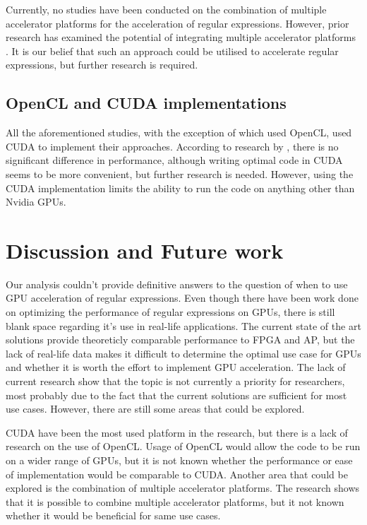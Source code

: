 \documentclass[10pt,onecolumn,twoside,english,a4paper]{article}
\begin{document}
Currently, no studies have been conducted on the combination of multiple accelerator platforms for the acceleration of regular expressions. However, prior research has examined the potential of integrating multiple accelerator platforms \cite{kobayashi2019gpu}. It is our belief that such an approach could be utilised to accelerate regular expressions, but further research is required.

\subsection{OpenCL and CUDA implementations} \label{OpenCL and CUDA implementations:Results}
All the aforementioned studies, with the exception of \cite{rosciszewski2014regular} which used OpenCL, used CUDA to implement their approaches. According to research by \cite{Fang:Comparison-cuda-opencl}, there is no significant difference in performance, although writing optimal code in CUDA seems to be more convenient, but further research is needed.
However, using the CUDA implementation limits the ability to run the code on anything other than Nvidia GPUs.

\section{Discussion and Future work} \label{Discussion and Future work}
Our analysis couldn't provide definitive answers to the question of when to use GPU acceleration of regular expressions. Even though there have been work done on optimizing the performance of regular expressions on GPUs, there is still blank space regarding it's use in real-life applications. The current state of the art solutions provide theoreticly comparable performance to FPGA and AP, but the lack of real-life data makes it difficult to determine the optimal use case for GPUs and whether it is worth the effort to implement GPU acceleration. The lack of current research show that the topic is not currently a priority for researchers, most probably due to the fact that the current solutions are sufficient for most use cases. However, there are still some areas that could be explored.

CUDA have been the most used platform in the research, but there is a lack of research on the use of OpenCL. Usage of OpenCL would allow the code to be run on a wider range of GPUs, but it is not known whether the performance or ease of implementation would be comparable to CUDA.
Another area that could be explored is the combination of multiple accelerator platforms. The research shows that it is possible to combine multiple accelerator platforms, but it not known whether it would be beneficial for same use cases.
\end{document}

